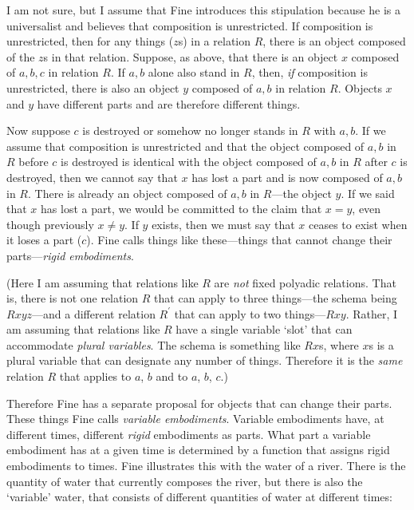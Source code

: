 \documentclass[11pt]{article}
\begin{document}
\begin{spacing}{1.5}
I am not sure, but I assume that Fine introduces this stipulation
because he is a universalist and believes that composition is
unrestricted.  If composition is unrestricted, then for any things
($z$s) in a relation $R$, there is an object composed of the $z$s in
that relation.  Suppose, as above, that there is an object $x$
composed of $a, b, c$ in relation $R$.  If $a, b$ alone also stand in
$R$, then, {\em if} composition is unrestricted, there is also an
object $y$ composed of $a, b$ in relation $R$.  Objects $x$ and $y$
have different parts and are therefore different things.

Now suppose $c$ is destroyed or somehow no longer stands in $R$ with
$a, b$.  If we assume that composition is unrestricted and that the
object composed of $a, b$ in $R$ before $c$ is destroyed is identical
with the object composed of $a, b$ in $R$ after $c$ is destroyed, then
we cannot say that $x$ has lost a part and is now composed of $a, b$
in $R$.  There is already an object composed of $a, b$ in $R$---the
object $y$.  If we said that $x$ has lost a part, we would be
committed to the claim that $x = y$, even though previously $x \neq
y$.  If $y$ exists, then we must say that $x$ ceases to exist when it
loses a part ($c$).  Fine calls things like these---things that cannot
change their parts---{\em rigid embodiments}.

(Here I am assuming that relations like $R$ are {\em not} fixed
polyadic relations.  That is, there is not one relation $R$ that can
apply to three things---the schema being $Rxyz$---and a different
relation $R^{\prime}$ that can apply to two things---$Rxy$.  Rather, I
am assuming that relations like $R$ have a single variable `slot' that
can accommodate {\em plural variables}.  The schema is something like
$Rx$s, where $x$s is a plural variable that can designate any number
of things.  Therefore it is the {\em same} relation $R$ that applies
to $a$, $b$ and to $a$, $b$, $c$.)

Therefore Fine has a separate proposal for objects that can change
their parts.  These things Fine calls {\em variable embodiments}.
Variable embodiments have, at different times, different {\em rigid}
embodiments as parts.  What part a variable embodiment has at a given
time is determined by a function that assigns rigid embodiments to
times.  Fine illustrates this with the water of a river.  There is the
quantity of water that currently composes the river, but there is also
the `variable' water, that consists of different quantities of water
at different times:


\end{spacing}
\end{document}
